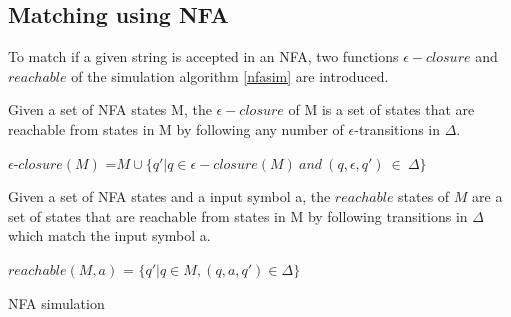 \subsection{Matching using NFA}
To match if a given string is accepted in an NFA, two functions $\epsilon-closure$ and $reachable$ of the simulation algorithm \ref{nfasim} are introduced.
\begin{mydef}
Given a set of NFA states M, the $\epsilon - closure$ of M is a set of states that are reachable from states in M by following any number of $\epsilon$-transitions in $\Delta$.
\begin{center}
$\epsilon$-$closure(M)$ =$ M \cup \{q'|q\in \epsilon-closure(M) ~and ~(q,\epsilon,q') ~ \in ~ \Delta\}$
\end{center}
\cite[p. 34, def 2.2]{compile}
\end{mydef}

\begin{mydef}
Given a set of NFA states and a input symbol a, the $reachable$ states of $M$ are a set of states that are reachable from states in M by following transitions in $\Delta$ which match the input symbol a. 
\begin{center}
$reachable(M,a)$ = $\{q'|q \in M,(q,a,q')\in \Delta \}$
\end{center}
\end{mydef}
\begin{algorithm}
  \caption{NFA simulation
    \label{nfasim}}
  \begin{algorithmic}[1]
            \State {}
        \EndIf
      \EndFor
        \State {}
      \EndIf
      \State {}
    \EndFunction
  \end{algorithmic}
\end{algorithm}

